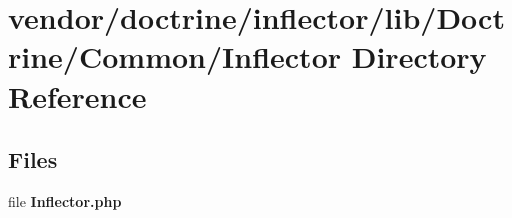 \section{vendor/doctrine/inflector/lib/\+Doctrine/\+Common/\+Inflector Directory Reference}
\label{dir_fb2c57e8efb5f22017db5f70617ef890}
\subsection*{Files}
\begin{DoxyCompactItemize}
\item 
file {\bf Inflector.\+php}
\end{DoxyCompactItemize}
